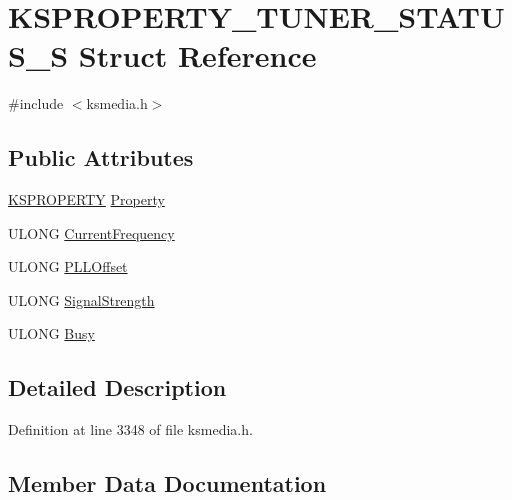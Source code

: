 \hypertarget{struct_k_s_p_r_o_p_e_r_t_y___t_u_n_e_r___s_t_a_t_u_s___s}{}\section{K\+S\+P\+R\+O\+P\+E\+R\+T\+Y\+\_\+\+T\+U\+N\+E\+R\+\_\+\+S\+T\+A\+T\+U\+S\+\_\+S Struct Reference}
\label{struct_k_s_p_r_o_p_e_r_t_y___t_u_n_e_r___s_t_a_t_u_s___s}


{\ttfamily \#include $<$ksmedia.\+h$>$}

\subsection*{Public Attributes}
\begin{DoxyCompactItemize}
\item 
\hyperlink{ks_8h_a4392f77c74e868d813d46c39ada4d660}{K\+S\+P\+R\+O\+P\+E\+R\+TY} \hyperlink{struct_k_s_p_r_o_p_e_r_t_y___t_u_n_e_r___s_t_a_t_u_s___s_a1aa106b2f455577d29edec0fc9bc6b14}{Property}
\item 
U\+L\+O\+NG \hyperlink{struct_k_s_p_r_o_p_e_r_t_y___t_u_n_e_r___s_t_a_t_u_s___s_a22af2a9a80b8795d23846946a9d98159}{Current\+Frequency}
\item 
U\+L\+O\+NG \hyperlink{struct_k_s_p_r_o_p_e_r_t_y___t_u_n_e_r___s_t_a_t_u_s___s_a48fa08dba28867362240006e6895a6bb}{P\+L\+L\+Offset}
\item 
U\+L\+O\+NG \hyperlink{struct_k_s_p_r_o_p_e_r_t_y___t_u_n_e_r___s_t_a_t_u_s___s_a89fa47e685ce5f69b03e0082328210a9}{Signal\+Strength}
\item 
U\+L\+O\+NG \hyperlink{struct_k_s_p_r_o_p_e_r_t_y___t_u_n_e_r___s_t_a_t_u_s___s_a7b5cd14fd8494b6aa7531e5236cce254}{Busy}
\end{DoxyCompactItemize}


\subsection{Detailed Description}


Definition at line 3348 of file ksmedia.\+h.



\subsection{Member Data Documentation}

